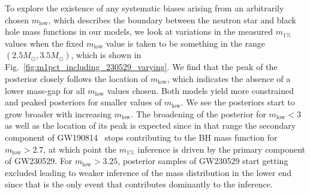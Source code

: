 \documentclass[modern]{aastex631}
\begin{document}
To explore the existence of any systematic biases arising from an arbitrarily
chosen $m_\mathrm{low}$, which describes the boundary between the
neutron star and black hole mass functions in our models, we look at variations
in the measured $m_{1\%}$ values when the fixed $m_\mathrm{low}$ value is taken
to be something in the range $(2.5M_{\odot},3.5M_{\odot})$, which is shown in
Fig.~\ref{fig:m1pct_including_230529_varying}. We find that the peak of the
posterior closely follows the location of $m_\mathrm{low}$, which indicates the
absence of a lower mass-gap for all $m_\mathrm{low}$ values chosen. Both models
yield more constrained and peaked posteriors for smaller values of
$m_{\mathrm{low}}$. We see the posteriors start to grow broader with increasing
$m_\mathrm{low}$. The broadening of the posterior for $m_\mathrm{low}<3$ as well
as the location of its peak is expected since in that range the secondary
component of GW190814~\citep{LIGOScientific:2020zkf} stops contributing to the
BH mass function for $m_\mathrm{low}>2.7$, at which point
the $m_{1\%}$ inference is driven by the primary component of
GW230529. For  $m_\mathrm{low}>3.25$, posterior samples of GW230529 start
getting excluded leading to weaker inference of the mass distribution in the
lower end since that is the only event that contributes dominantly to the
inference.


\end{document}
